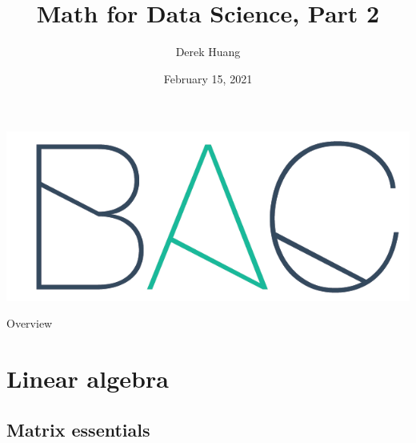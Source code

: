\documentclass{beamer}
\title[Math for Data Science, Part 2]{Math for Data Science, Part 2}
\author[Derek Huang (BAC Advanced Team)]{Derek Huang}
\institute{BAC Advanced Team}
\date{February 15, 2021}
\numberwithin{equation}{section}
\begin{document}
\begin{frame}
    \titlepage
    \centering
    \includegraphics[scale = 0.1]{../bac_logo1.png}
\end{frame}

\begin{frame}{Overview}
    \tableofcontents
\end{frame}

\section{Linear algebra}

\subsection{Matrix essentials}
\end{document}
